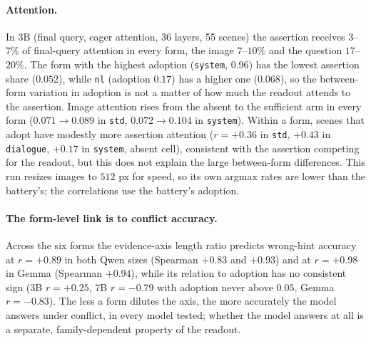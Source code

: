 \documentclass[10pt]{article}
\begin{document}
\paragraph{Attention.}
In 3B (final query, eager attention, 36 layers, 55 scenes) the assertion
receives $3$--$7\%$ of final-query attention in every form, the image
$7$--$10\%$ and the question $17$--$20\%$. The form with the highest adoption
(\texttt{system}, $0.96$) has the lowest assertion share ($0.052$), while
\texttt{nl} (adoption $0.17$) has a higher one ($0.068$), so the between-form
variation in adoption is not a matter of how much the readout attends to the
assertion. Image attention rises from the absent to the sufficient arm in
every form ($0.071\to0.089$ in \texttt{std}, $0.072\to0.104$ in
\texttt{system}). Within a form, scenes that adopt have modestly more
assertion attention ($r=+0.36$ in \texttt{std}, $+0.43$ in \texttt{dialogue},
$+0.17$ in \texttt{system}, absent cell), consistent with the assertion
competing for the readout, but this does not explain the large between-form
differences. This run resizes images to $512$ px for speed, so its own argmax
rates are lower than the battery's; the correlations use the battery's
adoption.

\paragraph{The form-level link is to conflict accuracy.}
Across the six forms the evidence-axis length ratio predicts wrong-hint
accuracy at $r=+0.89$ in both Qwen sizes (Spearman $+0.83$ and $+0.93$) and
at $r=+0.98$ in Gemma (Spearman $+0.94$), while its relation to adoption has
no consistent sign (3B $r=+0.25$, 7B $r=-0.79$ with adoption never above
$0.05$, Gemma $r=-0.83$). The less a form dilutes the axis, the more
accurately the model answers under conflict, in every model tested; whether
the model answers at all is a separate, family-dependent property of the
readout.
\end{document}
